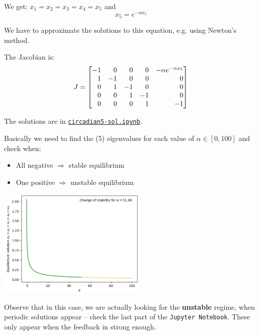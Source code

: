 \begin{solution}

\begin{slide}

\begin{parts}
	\item We get: $x_1 = x_2 = x_3 = x_4 = x_5$ and
	\[ x_5 = e^{-\alpha x_5} \]
	
	We have to approximate the solutions to this equation, e.g. using Newton's method.
	
	\item The Jacobian is:
		\[ J = 
			\mat { 	-1 & 0 & 0 & 0 & -\alpha e^{-\alpha x_5} \\
					1 & -1 & 0 & 0 & 0 \\
					0 & 1 & -1 & 0 &  0 \\
					0 & 0 & 1 & -1 &  0 \\
					0 & 0 & 0 & 1 & -1 
					}
		\]	
	\item The solutions are in \href{https://utoronto.syzygy.ca/jupyter/user-redirect/git-pull?repo=https://github.com/bigfatbernie/IBLMathModeling&subPath=book/python/circadian.ipynb}{\tt circadian5-sol.ipynb}.
	
	Basically we need to find the (5) eigenvalues for each value of $\alpha \in [0,100]$ and check when:
	\begin{itemize}
		\item All negative $\Rightarrow $ stable equilibrium
		\item One positive $\Rightarrow $ unstable equilibrium
	\end{itemize}
	
	\includegraphics[width=200pt]{images/circadian5.png}
	
	
	Observe that in this case, we are actually looking for the \textbf{unstable} regime, when periodic solutions appear -- check the last part of the \texttt{Jupyter Notebook}. These only appear when the feedback in strong enough.
\end{parts}
	
\end{slide}	
\end{solution}



